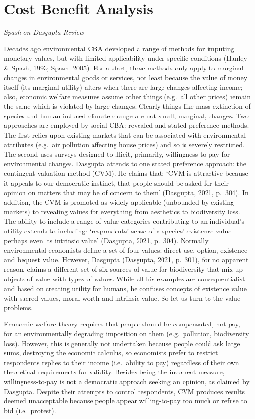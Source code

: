 \documentclass[
]{book}
\begin{document}
\hypertarget{cost-benefit-analysis}{%
\chapter{Cost Benefit Analysis}\label{cost-benefit-analysis}}

\emph{Spash on Dasgupta Review}

Decades ago environmental CBA developed a range of methods for imputing monetary values, but
with limited applicability under specific conditions (Hanley \& Spash, 1993; Spash, 2005). For a
start, these methods only apply to marginal changes in environmental goods or services, not
least because the value of money itself (its marginal utility) alters when there are large changes
affecting income; also, economic welfare measures assume other things (e.g.~all other prices) remain
the same which is violated by large changes. Clearly things like mass extinction of species and
human induced climate change are not small, marginal, changes.
Two approaches are employed by social CBA: revealed and stated preference methods. The first relies
upon existing markets that can be associated with environmental attributes (e.g.~air pollution affecting
house prices) and so is severely restricted. The second uses surveys designed to illicit, primarily,
willingness-to-pay for environmental changes. Dasgupta attends to one stated preference approach: the
contingent valuation method (CVM). He claims that: `CVM is attractive because it appeals to our
democratic instinct, that people should be asked for their opinion on matters that may be of concern
to them' (Dasgupta, 2021, p.~304). In addition, the CVM is promoted as widely applicable (unbounded
by existing markets) to revealing values for everything from aesthetics to biodiversity loss. The ability to
include a range of value categories contributing to an individual's utility extends to including:
`respondents' sense of a species' existence value---perhaps even its intrinsic value' (Dasgupta, 2021, p.~304).
Normally environmental economists define a set of four values: direct use, option, existence and bequest
value. However, Dasgupta (Dasgupta, 2021, p.~301), for no apparent reason, claims a different set of
six sources of value for biodiversity that mix-up objects of value with types of values. While all his
examples are consequentialist and based on creating utility for humans, he confuses concepts of
existence value with sacred values, moral worth and intrinsic value. So let us turn to the value problems.

Economic welfare theory requires that people should be
compensated, not pay, for an environmentally degrading imposition on them (e.g.~pollution,
biodiversity loss). However, this is generally not undertaken because people could ask large sums,
destroying the economic calculus, so economists prefer to restrict respondents replies to their
income (i.e.~ability to pay) regardless of their own theoretical requirements for validity.
Besides being the incorrect measure, willingness-to-pay is not a democratic approach
seeking an opinion, as claimed by Dasgupta.
Despite their attempts to control respondents, CVM produces results
deemed unacceptable because people appear willing-to-pay too much or refuse to bid (i.e.~protest).
\end{document}
